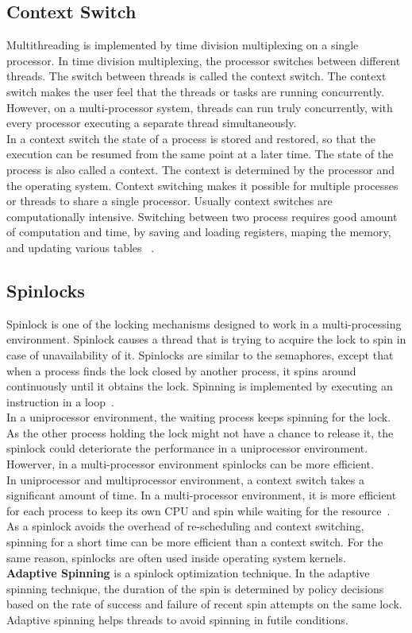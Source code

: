 \subsection{Context Switch}
Multithreading is implemented by time division multiplexing on a single processor. In time division multiplexing, the processor switches between different threads. The switch between threads is called the context switch. The context switch makes the user feel that the threads or tasks are running concurrently. However, on a multi-processor system, threads can run truly concurrently, with every processor executing a separate thread simultaneously. 
\\
In a context switch the state of a process is stored and restored, so that the execution can be resumed from the same point at a later time. The state of the process is also called a context. The context is determined by the processor and the operating system. Context switching makes it possible for multiple processes or threads to share a single processor. Usually context switches are computationally intensive. Switching between two process requires good amount of computation and time, by saving and loading registers, maping the memory, and updating various tables~\cite{Galvin} .

\subsection{Spinlocks}
Spinlock is one of the locking mechanisms designed to work in a multi-processing environment. Spinlock causes a thread that is trying to acquire the lock to spin in case of unavailability of it. Spinlocks are similar to the semaphores, except that when a process finds the lock closed by another process, it spins around continuously until it obtains the lock. Spinning is implemented by executing an instruction in a loop~\cite{Bovet:2005:ULK:1077084}.
\\[3mm]
In a uniprocessor environment, the waiting process keeps spinning for the lock. As the other process holding the lock might not have a chance to release it, the spinlock could deteriorate the performance in a uniprocessor environment. Howerver, in a multi-processor environment spinlocks can be more efficient. 
\\[3mm] 
In uniprocessor and multiprocessor environment, a context switch takes a significant amount of time. In a multi-processor environment, it is more efficient for each process to keep its own CPU and spin while waiting for the resource~\cite{Bovet:2005:ULK:1077084}. As a spinlock avoids the overhead of re-scheduling and context switching, spinning for a short time can be more efficient than a context switch. For the same reason, spinlocks are often used inside operating system kernels.
\\[3mm]
\textbf{Adaptive Spinning} is a spinlock optimization technique. In the adaptive spinning technique, the duration of the spin is determined by policy decisions based on the rate of success and failure of recent spin attempts on the same lock. Adaptive spinning helps threads to avoid spinning in futile conditions.

